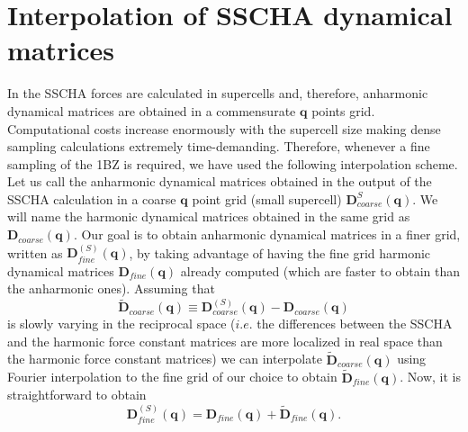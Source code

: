 
\chapter{Interpolation of SSCHA dynamical matrices} %

\label{appendixB} %

In the SSCHA forces are calculated in supercells and, therefore, anharmonic dynamical matrices are obtained in a 
commensurate $\boldsymbol{q}$ points grid. Computational costs increase enormously with the supercell size making 
dense sampling calculations extremely time-demanding. Therefore, whenever a fine sampling of the 1BZ is required, we 
have used the following interpolation scheme. \\

Let us call the anharmonic dynamical matrices obtained in the output of the SSCHA calculation in a coarse 
$\boldsymbol{q}$ point grid (small supercell) $\boldsymbol{D}_{coarse}^{S}(\boldsymbol{q})$. We will name the 
harmonic dynamical matrices obtained in the same grid as $\boldsymbol{D}_{coarse}(\boldsymbol{q})$. Our goal is to 
obtain anharmonic dynamical matrices in a finer grid, written as $\boldsymbol{D}_{fine}^{(S)}(\boldsymbol{q})$, by 
taking advantage of having the fine grid harmonic dynamical matrices $\boldsymbol{D}_{fine}(\boldsymbol{q})$ 
already computed (which are faster to obtain than the anharmonic ones). Assuming that
\begin{equation}
\tilde{\boldsymbol{D}}_{coarse}(\boldsymbol{q})\equiv\boldsymbol{D}_{coarse}^{(S)}(\boldsymbol{q})-
\boldsymbol{D}_{coarse}(\boldsymbol{q})
\end{equation}
is slowly varying in the reciprocal space ($i.e.$ the differences between the SSCHA and the harmonic force constant 
matrices are more localized in real space than the harmonic force constant matrices) we can interpolate 
$\tilde{\boldsymbol{D}}_{coarse}(\boldsymbol{q})$ using Fourier interpolation to the fine grid of our choice to 
obtain $\tilde{\boldsymbol{D}}_{fine}(\boldsymbol{q})$. Now, it is straightforward to obtain
\begin{equation}
\boldsymbol{D}_{fine}^{(S)}(\boldsymbol{q})=\boldsymbol{D}_{fine}(\boldsymbol{q})+
\tilde{\boldsymbol{D}}_{fine}(\boldsymbol{q}).
\end{equation}
